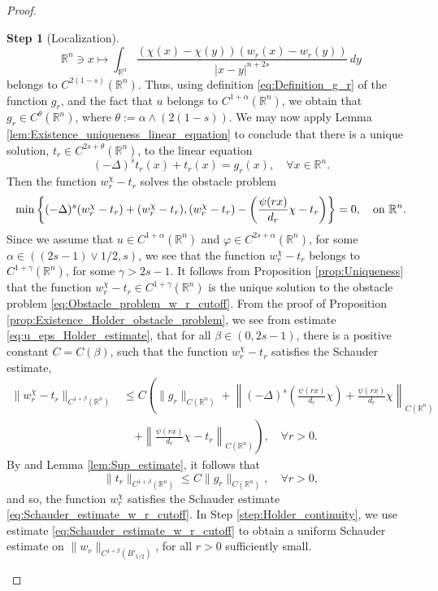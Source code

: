 \documentclass[11pt,reqno]{amsart}
\theoremstyle{definition}
\newtheorem{step}{Step}
\theoremstyle{remark}
\begin{document}
\begin{proof}
\begin{step}[Localization]
$$
{\mathbb{R}}^n\ni x\mapsto  \int_{{\mathbb{R}}^n}\frac{(\chi(x)-\chi(y))(w_r(x)-w_r(y))}{|x-y|^{n+2s}}\, dy
$$
belongs to $C^{2(1-s)}({\mathbb{R}}^n)$. Thus, using definition \eqref{eq:Definition_g_r} of the function $g_r$, and the fact that $u$ belongs to $C^{1+\alpha}({\mathbb{R}}^n)$, we obtain that $g_r \in C^{\theta}({\mathbb{R}}^n)$, where $\theta:=\alpha\wedge (2(1-s))$. We may now apply Lemma \ref{lem:Existence_uniqueness_linear_equation} to conclude that there is a unique solution, $t_r\in C^{2s+\theta}({\mathbb{R}}^n)$, to the linear equation
$$
(-\Delta)^s t_r(x) +t_r(x) = g_r(x),\quad\forall x\in {\mathbb{R}}^n.
$$
Then the function $w^{\chi}_r-t_r$ solves the obstacle problem
\begin{equation}
\label{eq:Obstacle_problem_w_r_cutoff}
\min\left\{(-\Delta)^s (w^{\chi}_r-t_r)+(w^{\chi}_r-t_r), (w^{\chi}_r-t_r)-\left(\frac{\psi(rx)}{d_r}\chi-t_r\right)\right\}=0,\quad\hbox{on } {\mathbb{R}}^n.
\end{equation}
Since we assume that $u\in C^{1+\alpha}({\mathbb{R}}^n)$ and $\varphi\in C^{2s+\alpha}({\mathbb{R}}^n)$, for some $\alpha \in ((2s-1)\vee 1/2,s)$, we see that the function $w^{\chi}_r-t_r$ belongs to $C^{1+\gamma}({\mathbb{R}}^n)$, for some $\gamma>2s-1$. It follows from Proposition \ref{prop:Uniqueness} that the function $w^{\chi}_r-t_r \in C^{1+\gamma}({\mathbb{R}}^n)$ is the unique solution to the obstacle problem \eqref{eq:Obstacle_problem_w_r_cutoff}. From the proof of Proposition \ref{prop:Existence_Holder_obstacle_problem}, we see from estimate \eqref{eq:u_eps_Holder_estimate}, that for all $\beta\in (0,2s-1)$, there is a positive constant $C=C(\beta)$, such that the function $w^{\chi}_r-t_r$ satisfies the Schauder estimate,
\begin{equation*}
\begin{aligned}
\|w^{\chi}_r-t_r\|_{C^{1+\beta}({\mathbb{R}}^n)} &\leq C\left(\|g_r\|_{C({\mathbb{R}}^n)}+\left\|(-\Delta)^s\left(\frac{\psi(rx)}{d_r}\chi\right)+\frac{\psi(rx)}{d_r}\chi\right\|_{C({\mathbb{R}}^n)}\right.\\
&\quad\left.+\left\|\frac{\psi(rx)}{d_r}\chi-t_r\right\|_{C({\mathbb{R}}^n)}\right),\quad\forall r>0.
\end{aligned}
\end{equation*}
By \cite[Proposition 2.9]{Silvestre_2007} and Lemma \ref{lem:Sup_estimate}, it follows that
\begin{equation*}
\|t_r\|_{C^{1+\beta}({\mathbb{R}}^n)} \leq C\|g_r\|_{C({\mathbb{R}}^n)},\quad\forall r>0,
\end{equation*}
and so, the function $w^{\chi}_r$ satisfies the Schauder estimate \eqref{eq:Schauder_estimate_w_r_cutoff}. In Step \ref{step:Holder_continuity}, we use estimate \eqref{eq:Schauder_estimate_w_r_cutoff} to obtain a uniform Schauder estimate on $\|w_r\|_{C^{1+\beta}(B'_{1/2})}$, for all $r>0$ sufficiently small.
\end{step}


\end{proof}
\end{document}
